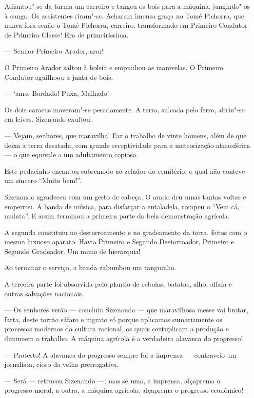 Adiantou"-se da turma um carreiro e tangeu os bois para a máquina,
jungindo"-os à canga. Os assistentes riram"-se. Acharam imensa graça no
Tomé Pichorra, que nunca fora senão o Tomé Pichorra, carreiro,
transformado em Primeiro Condutor de Primeira Classe! Era de
primeiríssima.

--- Senhor Primeiro Arador, arar!

O Primeiro Arador saltou à boleia e empunhou as manivelas. O Primeiro
Condutor aguilhoou a junta de bois.

--- `amo, Bordado! Puxa, Malhado!

Os dois caracus moveram"-se pesadamente. A terra, sulcada pelo ferro,
abriu"-se em leivas. Sizenando exultou.

--- Vejam, senhores, que maravilha! Faz o trabalho de vinte homens, além
de que deixa a terra desatada, com grande receptividade para a
meteorização atmosférica --- o que equivale a um adubamento copioso.

Este pedacinho encantou sobremodo ao zelador do cemitério, o qual não
conteve um sincero ``Muito bem!''.

Sizenando agradeceu com um gesto de cabeça. O arado deu umas tantas
voltas e emperrou. A banda de música, para disfarçar a entaladela,
rompeu o ``Vem cá, mulata''. E assim terminou a primeira parte da bela
demonstração agrícola.

A segunda constituiu no destorroamento e no gradeamento da terra, feitos
com o mesmo luxuoso aparato. Havia Primeiro e Segundo Destorroador,
Primeiro e Segundo Gradeador. Um mimo de hierarquia!

Ao terminar o serviço, a banda zabumbou um tanguinho.

A terceira parte foi absorvida pelo plantio de cebolas, batatas, alho,
alfafa e outras salvações nacionais.

--- Os senhores verão --- concluiu Sizenando --- que maravilhosa messe
vai brotar, farta, deste torrão sáfaro e ingrato só porque aplicamos
sumariamente os processos modernos da cultura racional, os quais
centuplicam a produção e diminuem o trabalho. A máquina agrícola é a
verdadeira alavanca do progresso!

--- Protesto! A alavanca do progresso sempre foi a imprensa ---
contraveio um jornalista, cioso da velha prerrogativa.

--- Será --- retrucou Sizenando ---; mas se uma, a imprensa, alçaprema o
progresso moral, a outra, a máquina agrícola, alçaprema o progresso
econômico!

